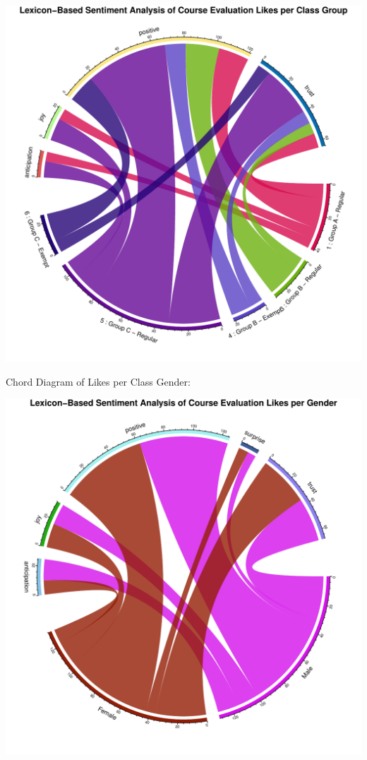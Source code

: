 \documentclass[
]{article}
\begin{document}
\includegraphics{10.b.BBT4206-End-SemesterCourseEvaluation-20230821-20231128-BI2-BBIT4-2_files/figure-latex/ChordDiagramLikesPerGroup-1.pdf}

\newpage

Chord Diagram of Likes per Class Gender:

\includegraphics{10.b.BBT4206-End-SemesterCourseEvaluation-20230821-20231128-BI2-BBIT4-2_files/figure-latex/ChordDiagramLikesPerGender-1.pdf}
\end{document}
